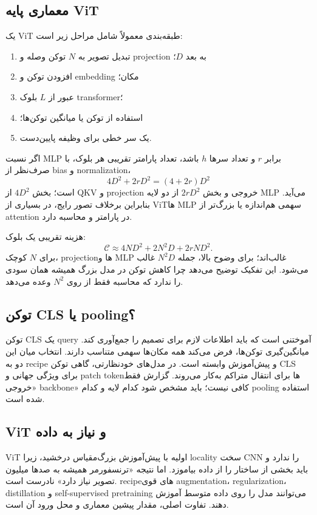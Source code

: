 \documentclass[12pt,openany,oneside]{book}
\begin{document}
\subsection{معماری پایه ViT}
یک ViT طبقه‌بندی معمولاً شامل مراحل زیر است:
\begin{enumerate}
\item تبدیل تصویر به $N$ توکن وصله و projection به بعد $D$؛
\item افزودن توکن  و embedding مکان؛
\item عبور از $L$ بلوک transformer؛
\item استفاده از توکن  یا میانگین توکن‌ها؛
\item یک سر خطی برای وظیفه پایین‌دست.
\end{enumerate}
اگر نسبت MLP برابر $r$ و تعداد سرها $h$ باشد، تعداد پارامتر تقریبی هر بلوک، با صرف‌نظر از bias و normalization،
\begin{equation}
4D^2+2rD^2=(4+2r)D^2
\end{equation}
است؛ بخش $4D^2$ از QKV و projection خروجی و بخش $2rD^2$ از دو لایه MLP می‌آید. بنابراین برخلاف تصور رایج، در بسیاری از ViTها MLP سهمی هم‌اندازه یا بزرگ‌تر از attention در پارامتر و محاسبه دارد.

هزینه تقریبی یک بلوک:
\begin{equation}
\mathcal C\approx 4ND^2+2N^2D+2rND^2.
\label{eq:vit-cost}
\end{equation}
برای $N$ کوچک، projectionها و MLP غالب‌اند؛ برای وضوح بالا، جمله $N^2D$ غالب می‌شود. این تفکیک توضیح می‌دهد چرا کاهش توکن در مدل بزرگ همیشه همان سودی را ندارد که محاسبه فقط از روی $N^2$ وعده می‌دهد.

\subsection{توکن CLS یا pooling؟}
توکن CLS یک query آموختنی است که باید اطلاعات لازم برای تصمیم را جمع‌آوری کند. میانگین‌گیری توکن‌ها، فرض می‌کند همه مکان‌ها سهمی متناسب دارند. انتخاب میان این دو به recipe و پیش‌آموزش وابسته است. در مدل‌های خودنظارتی، گاهی توکن CLS برای ویژگی جهانی و patch tokenها برای انتقال متراکم به‌کار می‌روند. گزارش فقط «خروجی backbone» کافی نیست؛ باید مشخص شود کدام لایه و کدام pooling استفاده شده است.

\subsection{ViT و نیاز به داده}
ViT اولیه با پیش‌آموزش بزرگ‌مقیاس درخشید، زیرا locality سخت CNN را ندارد و باید بخشی از ساختار را از داده بیاموزد. اما نتیجه «ترنسفورمر همیشه به صدها میلیون تصویر نیاز دارد» نادرست است. recipeهای قوی augmentation، regularization، distillation و self-supervised pretraining می‌توانند مدل را روی داده متوسط آموزش دهند. تفاوت اصلی، مقدار پیشین معماری و محل ورود آن است.
\end{document}

